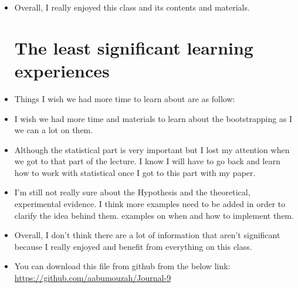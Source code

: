 \documentclass{article}
\begin{document}
\begin{itemize}
    \item Overall, I really enjoyed this class and its contents and materials.
    \section {The least significant learning experiences}
    \item Things I wish we had more time to learn about are as follow:  
    \item I wish we had more time and materials to learn about the bootstrapping as I we can a lot on them. 
    \item Although the statistical part is very important but I lost my attention when we got to that part of the lecture. I know I will have to go back and learn how to work with statistical once I got to this part with my paper.  
    \item I'm still not really sure about the Hypothesis and the theoretical, experimental evidence. I think more examples need to be added in order to clarify the idea behind them. examples on when and how to implement them. 
    \item Overall, I don't think there are a lot of information that aren't significant because I really enjoyed and benefit from everything on this class. 

    
    \item You can download this file from github from the below link: \url{https://github.com/aabumouzah/Journal-9}
\end{itemize}
\end{document}
